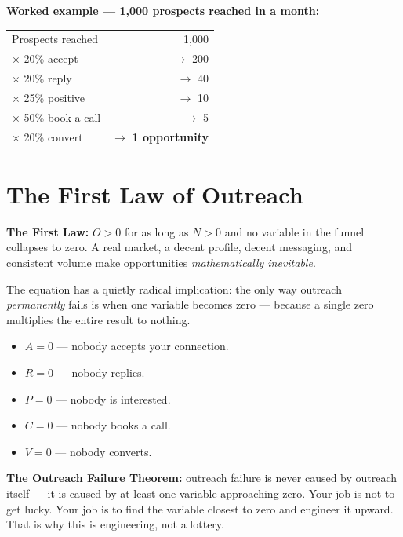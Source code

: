 \begin{example}
\textbf{Worked example --- 1,000 prospects reached in a month:}
\begin{center}
\begin{tabular}{lr}
Prospects reached & 1{,}000 \\
$\times$ 20\% accept & $\rightarrow$ 200 \\
$\times$ 20\% reply & $\rightarrow$ 40 \\
$\times$ 25\% positive & $\rightarrow$ 10 \\
$\times$ 50\% book a call & $\rightarrow$ 5 \\
$\times$ 20\% convert & $\rightarrow$ \textbf{1 opportunity} \\
\end{tabular}
\end{center}
\end{example}

\section{The First Law of Outreach}

\begin{keytakeaway}
\textbf{The First Law:} $O > 0$ for as long as $N > 0$ and no variable in the funnel collapses to zero. A real
market, a decent profile, decent messaging, and consistent volume make opportunities \emph{mathematically
inevitable}.
\end{keytakeaway}

The equation has a quietly radical implication: the only way outreach \emph{permanently} fails is when one
variable becomes zero --- because a single zero multiplies the entire result to nothing.

\begin{itemize}
  \item $A = 0$ --- nobody accepts your connection.
  \item $R = 0$ --- nobody replies.
  \item $P = 0$ --- nobody is interested.
  \item $C = 0$ --- nobody books a call.
  \item $V = 0$ --- nobody converts.
\end{itemize}

\textbf{The Outreach Failure Theorem:} outreach failure is never caused by outreach itself --- it is caused by at
least one variable approaching zero. Your job is not to get lucky. Your job is to find the variable closest to
zero and engineer it upward. That is why this is engineering, not a lottery.

